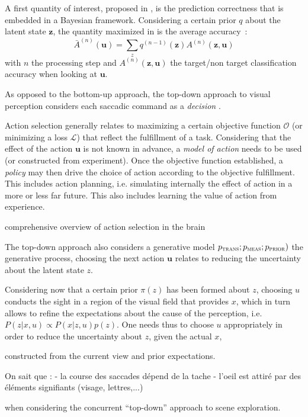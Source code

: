\documentclass[12pt,twoside,openright]{article}
\begin{document}
{\color{magenta}

A first quantity of interest, proposed in \cite{najemnik2005optimal}, is the prediction correctness that is embedded in a Bayesian framework. Considering a certain prior $q$ about the latent state $\boldsymbol{z}$, the quantity maximized in \cite{najemnik2005optimal} is the average accuracy~:
$$\bar{A}^{(n)}(\boldsymbol{u}) = \sum_z q^{(n-1)}(\boldsymbol{z}) A^{(n)}(\boldsymbol{z}, \boldsymbol{u})$$  
with $n$ the processing step and $A^{(n)}(\boldsymbol{z}, \boldsymbol{u})$ the target/non target classification accuracy when looking at $\boldsymbol{u}$.



As opposed to the bottom-up approach, the top-down approach to visual perception considers 
each saccadic command as a \emph {decision} \cite{berthoz1996neural}.


Action selection generally relates to maximizing a certain objective function $\mathcal{O}$ (or minimizing a loss $\mathcal{L}$) that reflect the fulfillment of a task. 
Considering that the effect of the action $\boldsymbol{u}$ is not known in advance, a \emph{model of action} needs to be used (or constructed from experiment).
Once the objective function established, a \emph{policy} may then drive the choice of action according to the objective fulfillment.  
This includes action planning, i.e. simulating internally the effect of action in a more or less far future. This also includes learning the value of action from experience. 



 comprehensive overview of action selection in the brain 



The top-down approach also considers a generative model $p_\text{\sc trans}; p_\text{\sc meas};p_\text{\sc prior})$ the generative process, choosing the next action $\boldsymbol{u}$ relates to reducing the uncertainty about the latent state $z$.




Considering now that a certain prior $\pi(z)$ has been formed about $z$, choosing  $u$ conducts the sight in a region of the visual field that provides $x$, which in turn allows to refine the expectations about the cause of the perception, i.e.
$ P(z|x,u) \propto P(x|z,u) p(z)$. 
One needs thus to choose $u$ appropriately in order to reduce the uncertainty about $z$, given the actual $x$,

constructed from the current view and prior expectations. 

On sait que :
- la course des saccades dépend de la tache
- l'oeil est attiré par des éléments signifiants (visage, lettres,...)

when considering the concurrent ``top-down'' approach to scene exploration. 
 }
\end{document}
